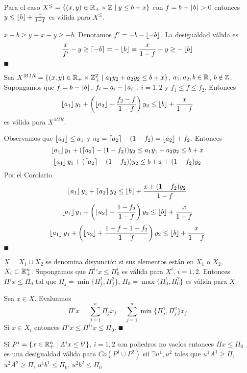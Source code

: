 \documentclass[MIOP.tex]{subfiles}
\begin{document}
\begin{coro}
Para el caso $X^\leq =\{(x,y)\in\mathbb{R}_+\times \mathbb{Z} \mid y\leq b+x\}$ con $f=b-\left\lfloor{b}\right\rfloor>0$ entonces $y\leq \left\lfloor{b}\right\rfloor+\frac{x}{1-f}$ es válida para $X^\leq$.
\end{coro}
\begin{dem}
$x+b\geq y \equiv x-y\geq -b$. Denotamos $f'=-b-\left\lfloor{-b}\right\rfloor$. La desigualdad válida es 
$$
\frac{x}{f'}-y\geq \left\lceil{-b}\right\rceil=-\left\lfloor{b}\right\rfloor \equiv \frac{x}{1-f}-y \geq -\left\lfloor{b}\right\rfloor
$$
$\QED$
\end{dem}
\begin{propi}
Sea $X^{MIR}=\{(x,y)\in\mathbb{R}_+\times \mathbb{Z}_+^2 \mid a_1y_2+a_2y_2\leq b+x\}$, $a_1,a_2,b\in\mathbb{R}$, $b\notin \mathbb{Z}$. Supongamos que $f=b-\left\lfloor{b}\right\rfloor$, $f_i = a_i -\left\lfloor{a_i}\right\rfloor$, $i=1,2$ y $f_1\leq f\leq f_2$. Entonces 
$$
\left\lfloor{a_1}\right\rfloor y_1+\left(\left\lfloor{a_2}\right\rfloor+\frac{f_2-f}{1-f}\right)y_2\leq \left\lfloor{b}\right\rfloor+\frac{x}{1-f}$$
es válida para $X^{MIR}$.
\end{propi}
\begin{dem}
Observamos que $\left\lfloor{a_1}\right\rfloor\leq a_1$ y $a_2=\left\lceil{a_2}\right\rceil-(1-f_2)=\left\lfloor{a_2}\right\rfloor+f_2$. Entonces
$$
\left\lfloor{a_1}\right\rfloor y_1+(\left\lceil{a_2}\right\rceil-(1-f_2))y_2 \leq a_1y_1 + a_2y_2\leq b+x
$$
$$\left\lfloor{a_1}\right\rfloor y_1+(\left\lceil{a_2}\right\rceil-(1-f_2))y_2 \leq b+x+(1-f_2)y_2$$
Por el Corolario
$$
\left\lfloor{a_1}\right\rfloor y_1+\left\lceil{a_2}\right\rceil y_2 \leq \left\lfloor{b}\right\rfloor+\frac{x+(1-f_2)y_2}{1-f}
$$
$$
\left\lfloor{a_1}\right\rfloor y_1+\left(\left\lceil{a_2}\right\rceil-\frac{1-f_2}{1-f}\right)y_2 \leq \left\lfloor{b}\right\rfloor+\frac{x}{1-f}
$$
$$
\left\lfloor{a_1}\right\rfloor y_1+\left(\left\lfloor{a_2}\right\rfloor+\frac{1-f-1+f_2}{1-f}\right)y_2\leq \left\lfloor{b}\right\rfloor+\frac{x}{1-f}
$$
$\QED$
\end{dem}
\begin{prop}
$X=X_1\cup X_2$ se denomina disyunción si sus elementos están en $X_1$ o $X_2$, $X_i\subset \mathbb{R}^n_+$. Supongamos que ${\Pi^i}'x\leq \Pi^i_0$ es válida para $X^i$, $i=1,2$. Entonces $\Pi' x\leq \Pi_0$ tal que $\Pi_j=\min\{\Pi^1_j,\Pi^2_j\}$, $\Pi_0 =\max\{\Pi^1_0,\Pi^2_0\}$ es válida para $X$.
\end{prop}
\begin{dem}
Sea $x\in X$. Evaluamos
$$
\Pi' x = \sum_{j=1}^n \Pi_j x_j = \sum_{j=1}^n \min\{\Pi_j^1,\Pi_j^2\}x_j
$$
Si $x\in X_i$ entonces $\Pi'x \leq {\Pi^i}' x \leq \Pi_0$. 
$\QED$
\end{dem}
\begin{prop}
Si $P^i = \{x\in\mathbb{R}^n_+\mid A^i x \leq b^i\}$, $i=1,2$ son poliedros no vacíos entonces $\Pi x\leq \Pi_0$ es una desigualdad válida para $Co(P^1\cup P^2)$ sii $\exists u^1,u^2$ tales que $u^1A^1\geq \Pi$, $u^2A^2 \geq \Pi$, $u^1 b^1 \leq \Pi_0$, $u^2b^2\leq \Pi_0$
\end{prop}
\end{document}
